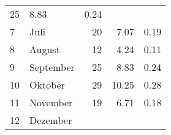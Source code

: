 \begin{longtable}{lXrrr}
       \num{25} &
       \num[round-mode=places,round-precision=2]{8.83} &
         \num[round-mode=places,round-precision=2]{0.24} \\

     7 &
     \multicolumn{1}{X}{ Juli   } &


       \num{20} &
       \num[round-mode=places,round-precision=2]{7.07} &
         \num[round-mode=places,round-precision=2]{0.19} \\

     8 &
     \multicolumn{1}{X}{ August   } &


       \num{12} &
       \num[round-mode=places,round-precision=2]{4.24} &
         \num[round-mode=places,round-precision=2]{0.11} \\

     9 &
     \multicolumn{1}{X}{ September   } &


       \num{25} &
       \num[round-mode=places,round-precision=2]{8.83} &
         \num[round-mode=places,round-precision=2]{0.24} \\

     10 &
     \multicolumn{1}{X}{ Oktober   } &


       \num{29} &
       \num[round-mode=places,round-precision=2]{10.25} &
         \num[round-mode=places,round-precision=2]{0.28} \\

     11 &
     \multicolumn{1}{X}{ November   } &


       \num{19} &
       \num[round-mode=places,round-precision=2]{6.71} &
         \num[round-mode=places,round-precision=2]{0.18} \\

     12 &
     \multicolumn{1}{X}{ Dezember   } &



\end{longtable}
